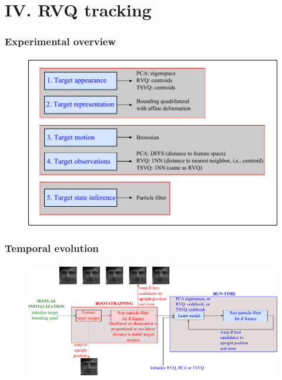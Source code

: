 \section{IV. RVQ tracking}
\begin{frame}
\frametitle{Experimental overview}
\framesubtitle{}
\logoCSIPCPL\mypagenum
\setcounter{subfigure}{0}
\begin{figure}[t]
\centering
\includegraphics[width=1.0\textwidth]{thesis/PhD_experimentalOverview.pdf}
\label{fig:overview}
\end{figure}
\end{frame}



\begin{frame}[plain]
\frametitle{Temporal evolution}
\framesubtitle{}
\logoCSIPCPL\mypagenum
\setcounter{subfigure}{0}
\begin{changemargin}{-1.3in}{0in}
\begin{figure}[t]
\centering
\includegraphics[width=1.3\textwidth]{thesis/PhD_experimentalTemporalOverview.pdf}
\label{fig:temporal_overview}
\end{figure}
\end{changemargin}
\end{frame}


